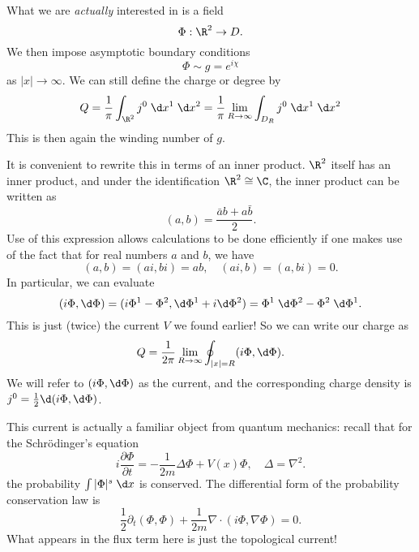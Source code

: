 \documentclass[a4paper]{article}
\begin{document}
What we are \emph{actually} interested in is a field
\[
  \Phi: \R^2 \to D.
\]
We then impose asymptotic boundary conditions
\[
  \Phi \sim g = e^{i\chi}
\]
as $|x| \to \infty$. We can still define the charge or degree by
\[
  Q = \frac{1}{\pi} \int_{\R^2} j^0 \;\d x^1 \;\d x^2 = \frac{1}{\pi} \lim_{R \to \infty}\int_{D_R} j^0 \;\d x^1 \;\d x^2
\]
This is then again the winding number of $g$.

It is convenient to rewrite this in terms of an inner product. $\R^2$ itself has an inner product, and under the identification $\R^2 \cong \C$, the inner product can be written as
\[
  (a, b) = \frac{\bar{a} b + a \bar{b}}{2}.
\]
Use of this expression allows calculations to be done efficiently if one makes use of the fact that for real numbers $a$ and $b$, we have
\[
  (a, b) = (ai, bi) = ab, \quad (ai, b) = (a, bi) = 0.
\]
In particular, we can evaluate
\[
  (i \Phi, \d \Phi) = (i \Phi^1 - \Phi^2, \d \Phi^1 + i \d \Phi^2) = \Phi^1\;\d \Phi^2 - \Phi^2\;\d \Phi^1.
\]
This is just (twice) the current $V$ we found earlier! So we can write our charge as
\[
  Q = \frac{1}{2\pi} \lim_{R \to \infty} \oint_{|x| = R} (i \Phi, \d \Phi).
\]
We will refer to $(i \Phi, \d \Phi)$ as the current, and the corresponding charge density is $j^0 = \frac{1}{2} \d (i \Phi, \d \Phi)$.


This current is actually a familiar object from quantum mechanics: recall that for the Schr\"odinger's equation
\[
  i \frac{\partial \Phi}{\partial t} = - \frac{1}{2m} \Delta \Phi + V(x) \Phi,\quad \Delta = \nabla^2.
\]
the probability $\int |\Phi|^s \;\d x$ is conserved. The differential form of the probability conservation law is
\[
  \frac{1}{2} \partial_t (\Phi, \Phi) + \frac{1}{2m} \nabla \cdot (i \Phi, \nabla \Phi) = 0.
\]
What appears in the flux term here is just the topological current!
\end{document}
